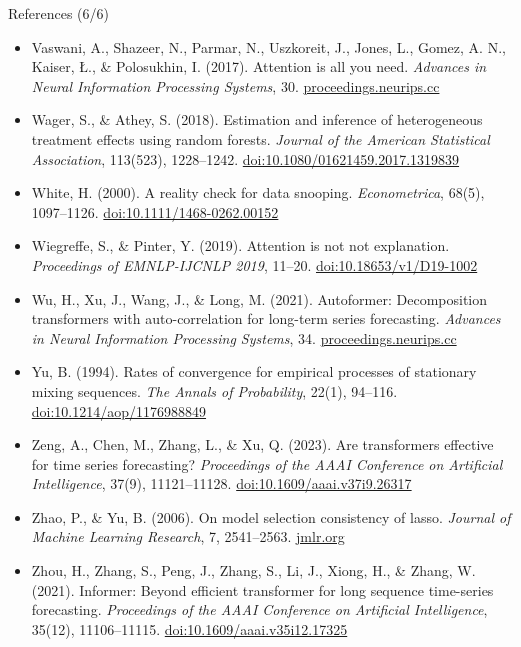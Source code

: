 \begin{frame}{References (6/6)}
\itemsize{\tiny}
\begin{itemize}
    \item Vaswani, A., Shazeer, N., Parmar, N., Uszkoreit, J., Jones, L., Gomez, A. N., Kaiser, Ł., \& Polosukhin, I. (2017). Attention is all you need. \textit{Advances in Neural Information Processing Systems}, 30. \href{https://proceedings.neurips.cc/paper/2017/hash/3f5ee243547dee91fbd053c1c4a845aa-Abstract.html}{proceedings.neurips.cc}
    \item Wager, S., \& Athey, S. (2018). Estimation and inference of heterogeneous treatment effects using random forests. \textit{Journal of the American Statistical Association}, 113(523), 1228--1242. \href{https://doi.org/10.1080/01621459.2017.1319839}{doi:10.1080/01621459.2017.1319839}
    \item White, H. (2000). A reality check for data snooping. \textit{Econometrica}, 68(5), 1097--1126. \href{https://doi.org/10.1111/1468-0262.00152}{doi:10.1111/1468-0262.00152}
    \item Wiegreffe, S., \& Pinter, Y. (2019). Attention is not not explanation. \textit{Proceedings of EMNLP-IJCNLP 2019}, 11--20. \href{https://doi.org/10.18653/v1/D19-1002}{doi:10.18653/v1/D19-1002}
    \item Wu, H., Xu, J., Wang, J., \& Long, M. (2021). Autoformer: Decomposition transformers with auto-correlation for long-term series forecasting. \textit{Advances in Neural Information Processing Systems}, 34. \href{https://proceedings.neurips.cc/paper/2021/hash/bcc0d400288793e8bdcd7c19a8ac0c2b-Abstract.html}{proceedings.neurips.cc}
    \item Yu, B. (1994). Rates of convergence for empirical processes of stationary mixing sequences. \textit{The Annals of Probability}, 22(1), 94--116. \href{https://doi.org/10.1214/aop/1176988849}{doi:10.1214/aop/1176988849}
    \item Zeng, A., Chen, M., Zhang, L., \& Xu, Q. (2023). Are transformers effective for time series forecasting? \textit{Proceedings of the AAAI Conference on Artificial Intelligence}, 37(9), 11121--11128. \href{https://doi.org/10.1609/aaai.v37i9.26317}{doi:10.1609/aaai.v37i9.26317}
    \item Zhao, P., \& Yu, B. (2006). On model selection consistency of lasso. \textit{Journal of Machine Learning Research}, 7, 2541--2563. \href{https://jmlr.org/papers/v7/zhao06a.html}{jmlr.org}
    \item Zhou, H., Zhang, S., Peng, J., Zhang, S., Li, J., Xiong, H., \& Zhang, W. (2021). Informer: Beyond efficient transformer for long sequence time-series forecasting. \textit{Proceedings of the AAAI Conference on Artificial Intelligence}, 35(12), 11106--11115. \href{https://doi.org/10.1609/aaai.v35i12.17325}{doi:10.1609/aaai.v35i12.17325}

\end{itemize}
\end{frame}
